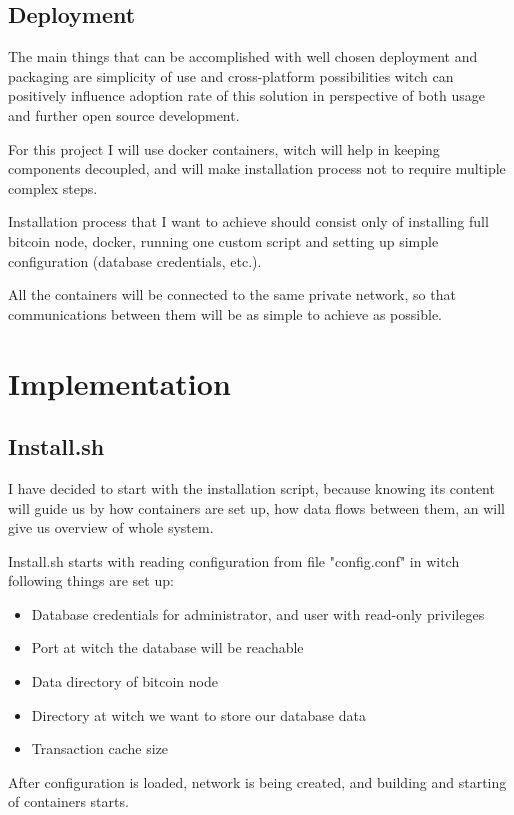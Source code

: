 \documentclass[12pt, en, eng]{mgr}
\begin{document}
\subsection{Deployment}

The main things that can be accomplished with well chosen deployment and packaging are simplicity of use and cross-platform possibilities witch can positively influence adoption rate of this solution in perspective of both usage and further open source development.

For this project I will use docker containers, witch will help in keeping components decoupled, and will make installation process not to require multiple complex steps. 

Installation process that I want to achieve should consist only of installing full bitcoin node, docker, running one custom script and setting up simple configuration (database credentials, etc.).

All the containers will be connected to the same private network, so that communications between them will be as simple to achieve as possible.

\section{Implementation}

\subsection{Install.sh}
I have decided to start with the installation script, because knowing its content will guide us by how containers are set up, how data flows between them, an will give us overview of whole system.

Install.sh starts with reading configuration from file "config.conf" in witch following things are set up:

\begin{itemize}
\item
Database credentials for administrator, and user with read-only privileges
\item
Port at witch the database will be reachable
\item
Data directory of bitcoin node
\item
Directory at witch we want to store our database data
\item
Transaction cache size
\end{itemize} 

After configuration is loaded, network is being created, and building and starting of containers starts.
\end{document}
